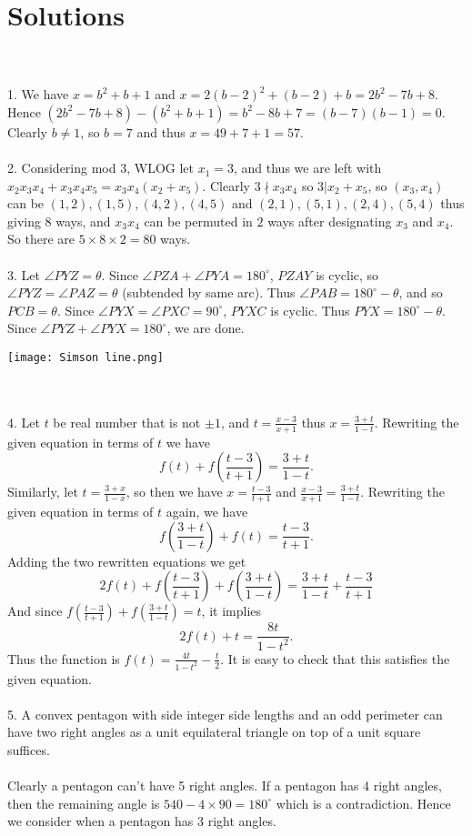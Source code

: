 \documentclass{article}
\begin{document}
\section{Solutions} \\\\
1. We have $x=b^2+b+1$ and $x=2(b-2)^2+(b-2)+b=2b^2-7b+8$. Hence $(2b^2-7b+8)-(b^2+b+1)=b^2-8b+7=(b-7)(b-1)=0$. Clearly $b \neq 1$, so $b=7$ and thus $x=49+7+1=57.$ \\\\
2. Considering mod 3, WLOG let $x_1 = 3$, and thus we are left with $x_2x_3x_4 + x_3x_4x_5 = x_3x_4(x_2 + x_5).$ Clearly $3 \nmid x_3x_4$ so $3 \vert x_2+x_5$, so $(x_3,x_4)$ can be $(1,2), (1,5), (4,2), (4,5)$ and $(2,1), (5,1), (2,4), (5,4)$ thus giving 8 ways, and $x_3x_4$ can be permuted in $2$ ways after designating $x_3$ and $x_4$. So there are $5 \times 8 \times 2 = 80$ ways.\\\\
3. Let $\angle PYZ = \theta$. Since $\angle PZA + \angle PYA = 180^{\circ}$, $PZAY$ is cyclic, so $\angle PYZ = \angle PAZ = \theta$ (subtended by same arc). Thus $\angle PAB = 180^{\circ} - \theta$, and so $PCB = \theta$. Since $\angle PYX = \angle PXC = 90^{\circ}$, $PYXC$ is cyclic. Thus $PYX = 180^{\circ}-\theta$. Since $\angle PYZ + \angle PYX = 180^{\circ}$, we are done. \\ \centerline{\texttt{[image: Simson line.png]}}\\\\
4. Let $t$ be real number that is not $\pm 1$, and $t=\frac{x-3}{x+1}$ thus $x=\frac{3+t}{1-t}$. Rewriting the given equation in terms of $t$ we have $$f(t)+f(\frac{t-3}{t+1})=\frac{3+t}{1-t}.$$ Similarly, let $t=\frac{3+x}{1-x}$, so then we have $x=\frac{t-3}{t+1}$ and $\frac{x-3}{x+1}=\frac{3+t}{1-t}$. Rewriting the given equation in terms of $t$ again, we have $$f(\frac{3+t}{1-t}) + f(t)=\frac{t-3}{t+1}.$$ Adding the two rewritten equations we get $$2f(t)+f(\frac{t-3}{t+1})+f(\frac{3+t}{1-t})=\frac{3+t}{1-t}+\frac{t-3}{t+1}$$ And since $f(\frac{t-3}{t+1})+f(\frac{3+t}{1-t})=t$, it implies $$2f(t)+t=\frac{8t}{1-t^2}.$$ Thus the function is $f(t)=\frac{4t}{1-t^2}-\frac{t}{2}$. It is easy to check that this satisfies the given equation.  \\\\
5. A convex pentagon with side integer side lengths and an odd perimeter can have two right angles as a unit equilateral triangle on top of a unit square suffices. \\\\ Clearly a pentagon can't have 5 right angles. If a pentagon has 4 right angles, then the remaining angle is $540-4\times 90=180^{\circ}$ which is a contradiction. Hence we consider when a pentagon has 3 right angles. \\\\
\end{document}
